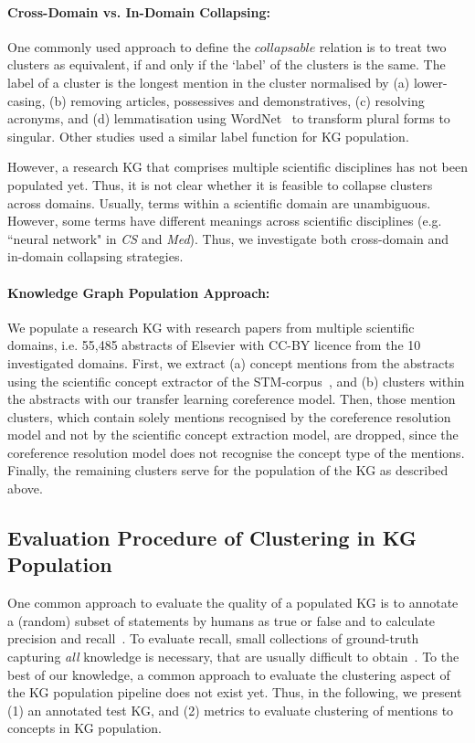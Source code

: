 \documentclass[runningheads]{llncs}
\begin{document}
\paragraph{Cross-Domain vs. In-Domain Collapsing:}
One commonly used approach to define the $collapsable$ relation is to treat two clusters as equivalent, if and only if the `label' of the clusters is the same.
The label of a cluster is the longest mention in the cluster normalised by (a) lower-casing, (b) removing articles, possessives and demonstratives, (c) resolving acronyms, and (d) lemmatisation using WordNet~\cite{Fellbaum2000WordNetA} to transform plural forms to singular. 
Other studies \cite{Dessi2020AIKG,Luan2018MultiTaskIO} used a similar label function for KG population.

However, a research KG that comprises multiple scientific disciplines has not been populated yet. 
Thus, it is not clear whether it is feasible to collapse clusters across domains. Usually, terms within a scientific domain are unambiguous. However, some terms have different meanings across scientific disciplines (e.g. ``neural network" in \emph{CS} and \emph{Med}).
Thus, we investigate both cross-domain and in-domain collapsing strategies.


\paragraph{Knowledge Graph Population Approach:}
We populate a research KG with research papers from multiple scientific domains, i.e. 55,485 abstracts of Elsevier with CC-BY licence from the 10 investigated domains.
First, we extract (a) concept mentions from the abstracts using the scientific concept extractor of the STM-corpus~\cite{Brack2020DomainindependentEO}, and (b) clusters within the abstracts with our transfer learning coreference model.
Then, those mention clusters, which contain solely mentions recognised by the coreference resolution model and not by the scientific concept extraction model, are dropped, since the coreference resolution model does not recognise the concept type of the mentions.
Finally, the remaining clusters serve for the population of the KG as described above.

\subsection{Evaluation Procedure of Clustering in KG Population}

One common approach to evaluate the quality of a populated KG is to annotate a (random) subset of statements by humans as true or false and to calculate precision and recall~\cite{Dessi2020AIKG,Weikum2020MachineKnowledge}. To evaluate recall, small collections of ground-truth capturing \emph{all} knowledge is necessary, that are usually difficult to obtain~\cite{Weikum2020MachineKnowledge}.
To the best of our knowledge, a common approach to evaluate the clustering aspect of the KG population pipeline does not exist yet.
Thus, in the following, we present (1) an annotated test KG, and (2) metrics to evaluate clustering of mentions to concepts in KG population.
\end{document}
